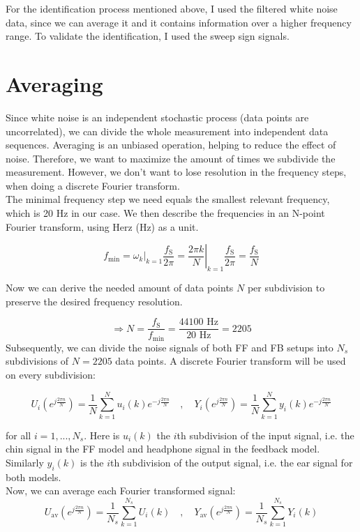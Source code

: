 For the identification process mentioned above, I used the filtered white noise data, since we can average it and it contains information over a higher frequency range. To validate the identification, I used the sweep sign signals.

\section{Averaging}

Since white noise is an independent stochastic process (data points are uncorrelated), we can divide the whole measurement into independent data sequences. Averaging is an unbiased operation, helping to reduce the effect of noise. Therefore, we want to maximize the amount of times we subdivide the measurement. However, we don't want to lose resolution in the frequency steps, when doing a discrete Fourier transform.\\

The minimal frequency step we need equals the smallest relevant frequency, which is 20 Hz in our case. We then describe the frequencies in an N-point Fourier transform, using Herz (Hz) as a unit.

\[ f_\text{min} =\left. \omega_k\right|_{k = 1}\frac{f_\text{S}}{2\pi} = \left. \frac{2\pi k}{N}\right|_{k = 1}\frac{f_\text{S}}{2\pi} = \frac{f_\text{S}}{N} \]

Now we can derive the needed amount of data points $N$ per subdivision to preserve the desired frequency resolution.

\[\Rightarrow N = \frac{f_\text{S}}{f_\text{min}} = \frac{44100 \text{ Hz}}{20 \text{ Hz}} = 2205\]
Subsequently, we can divide the noise signals of both FF and FB setups into $N_s$ subdivisions of $N = 2205$ data points. A discrete Fourier transform will be used on every subdivision:

\[U_i(e^{j\frac{2\pi n}{N}}) = \frac{1}{N}\sum\limits_{k = 1}^{N }u_i(k)e^{-j\frac{2\pi n}{N}} \quad, \quad Y_i(e^{j\frac{2\pi n}{N}}) = \frac{1}{N}\sum\limits_{k = 1}^{N }y_i(k)e^{-j\frac{2\pi n}{N}}\]

for all $i = 1, ..., N_s$. Here is $u_i(k)$ the $i$th subdivision of the input signal, i.e. the chin signal in the FF model and headphone signal in the feedback model. Similarly $y_i(k)$ is the $i$th subdivision of the output signal, i.e. the ear signal for both models. \\

Now, we can average each Fourier transformed signal:
\[U_\text{av}(e^{j\frac{2\pi n}{N}}) = \frac{1}{N_s}\sum\limits_{k = 1}^{N_s }U_i(k) \quad, \quad Y_\text{av}(e^{j\frac{2\pi n}{N}}) = \frac{1}{N_s}\sum\limits_{k = 1}^{N_s} Y_i(k)\]

